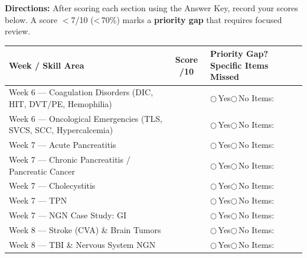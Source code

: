 \documentclass[11pt,letterpaper]{article}
\newcommand{\blank}[1][3cm]{\underline{\hspace{#1}}}
\begin{document}
\begin{gapbox}

\textbf{Directions:} After scoring each section using the Answer Key, record
your scores below.  A score $<$7/10 (\textless\,70\%) marks a \textbf{priority gap} that
requires focused review.

\vspace{0.4cm}
\begin{center}
\renewcommand{\arraystretch}{2.0}
\begin{longtable}{|p{6cm}|c|p{5.5cm}|}
\hline
\textbf{Week / Skill Area} & \textbf{Score /10}
  & \textbf{Priority Gap?\newline Specific Items Missed} \\
\hline
\endhead
Week 6 --- Coagulation Disorders (DIC, HIT, DVT/PE, Hemophilia) & \blank[1cm] & $\bigcirc$\,Yes\quad$\bigcirc$\,No \newline Items: \blank[4.5cm] \\
\hline
Week 6 --- Oncological Emergencies (TLS, SVCS, SCC, Hypercalcemia) & \blank[1cm] & $\bigcirc$\,Yes\quad$\bigcirc$\,No \newline Items: \blank[4.5cm] \\
\hline
Week 7 --- Acute Pancreatitis & \blank[1cm] & $\bigcirc$\,Yes\quad$\bigcirc$\,No \newline Items: \blank[4.5cm] \\
\hline
Week 7 --- Chronic Pancreatitis / Pancreatic Cancer & \blank[1cm] & $\bigcirc$\,Yes\quad$\bigcirc$\,No \newline Items: \blank[4.5cm] \\
\hline
Week 7 --- Cholecystitis & \blank[1cm] & $\bigcirc$\,Yes\quad$\bigcirc$\,No \newline Items: \blank[4.5cm] \\
\hline
Week 7 --- TPN & \blank[1cm] & $\bigcirc$\,Yes\quad$\bigcirc$\,No \newline Items: \blank[4.5cm] \\
\hline
Week 7 --- NGN Case Study: GI & \blank[1cm] & $\bigcirc$\,Yes\quad$\bigcirc$\,No \newline Items: \blank[4.5cm] \\
\hline
Week 8 --- Stroke (CVA) \& Brain Tumors & \blank[1cm] & $\bigcirc$\,Yes\quad$\bigcirc$\,No \newline Items: \blank[4.5cm] \\
\hline
Week 8 --- TBI \& Nervous System NGN & \blank[1cm] & $\bigcirc$\,Yes\quad$\bigcirc$\,No \newline Items: \blank[4.5cm] \\

\end{longtable}
\end{center}
\end{gapbox}
\end{document}
